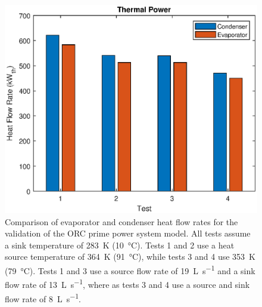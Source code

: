 \begin{figure}[p]
	\centering
	
	\includegraphics[width=\textwidth]{figures/VerificationHeat01}
	
	\caption{Comparison of evaporator and condenser heat flow rates for the validation of the ORC prime power system model. All tests assume a sink temperature of \SI{283}{\kelvin} (\SI{10}{\degreeCelsius}). Tests 1 and 2 use a heat source temperature of \SI{364}{\kelvin} (\SI{91}{\degreeCelsius}), while tests 3 and 4 use \SI{353}{\kelvin} (\SI{79}{\degreeCelsius}). Tests 1 and 3 use a source flow rate of \SI{19}{\liter\per\second} and a sink flow rate of \SI{13}{\liter\per\second}, where as tests 3 and 4 use a source and sink flow rate of \SI{8}{\liter\per\second}.
	}
	\label{fig:verificationHeat01}
\end{figure}